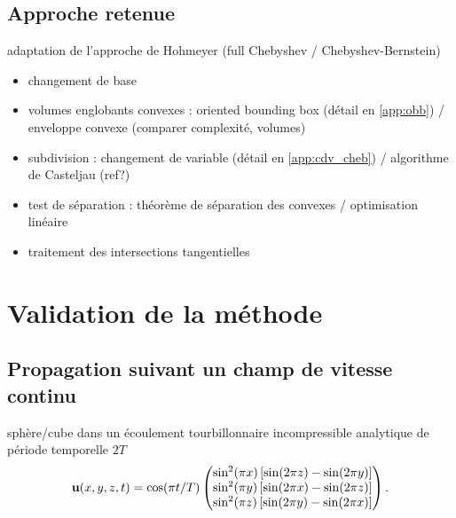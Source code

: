 \subsection{Approche retenue}
\label{sec:calcul_intersections}
adaptation de l'approche de Hohmeyer \cite{hohmeyer1992} (full Chebyshev / Chebyshev-Bernstein)
\begin{itemize}
	\item changement de base \cite{rababah2003}
	\item volumes englobants convexes : oriented bounding box \cite{fournier1994} (détail en \autoref{app:obb}) / enveloppe convexe (comparer complexité, volumes)
	\item subdivision : changement de variable (détail en \autoref{app:cdv_cheb}) / algorithme de Casteljau (ref?) 
	\item test de séparation : théorème de séparation des convexes \cite{eberly2002} / optimisation linéaire \cite{seidel1991}
	\item traitement des intersections tangentielles
\end{itemize}



\section{Validation de la méthode}

\subsection{Propagation suivant un champ de vitesse continu}
sphère/cube dans un écoulement tourbillonnaire incompressible analytique de période temporelle $2T$\\
\begin{equation}
	\mathbf{u}(x,y,z,t) = 
	\cos( \pi t/T )
	\begin{pmatrix} 
	\sin^2(\pi x) \left[ \sin(2\pi z) - \sin(2\pi y)\right] \\
\sin^2(\pi y) \left[ \sin(2\pi x) - \sin(2\pi z)\right] \\
\sin^2(\pi z) \left[ \sin(2\pi y) - \sin(2\pi x)\right]
	 \end{pmatrix}.
\end{equation}
%	

